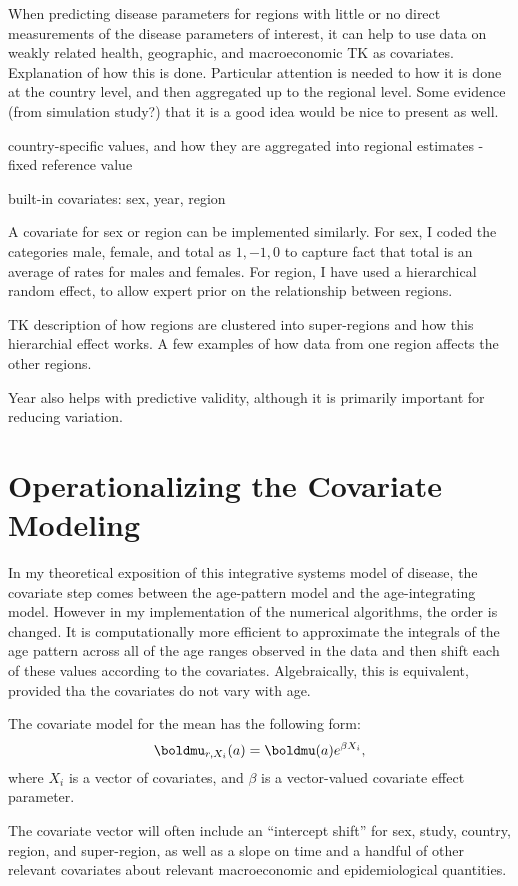 When predicting disease parameters for regions with little or no
direct measurements of the disease parameters of interest, it can help
to use data on weakly related health, geographic, and macroeconomic TK
as covariates. Explanation of how this is done.  Particular attention
is needed to how it is done at the country level, and then aggregated
up to the regional level. Some evidence (from simulation study?) that
it is a good idea would be nice to present as well.

country-specific values, and how they are aggregated into regional
estimates - fixed reference value

built-in covariates: sex, year, region

A covariate for sex or region can be implemented similarly.  For sex,
I coded the categories male, female, and total as $1, -1, 0$ to
capture fact that total is an average of rates for males and females.
For region, I have used a hierarchical random effect, to allow expert
prior on the relationship between regions.

TK description of how regions are clustered into super-regions and how
this hierarchial effect works.  A few examples of how data from one
region affects the other regions.

Year also helps with predictive validity, although it is primarily
important for reducing variation.


\section{Operationalizing the Covariate Modeling}

In my theoretical exposition of this integrative systems model
of disease, the covariate step comes between the age-pattern model and
the age-integrating model.  However in my implementation of the
numerical algorithms, the order is changed.  It is computationally
more efficient to approximate the integrals of the age pattern across
all of the age ranges observed in the data and then shift each of
these values according to the covariates.  Algebraically, this is
equivalent, provided tha the covariates do not vary with age.

The covariate model for the mean has the following form:
\[
\boldmu_{r,X_i}(a) = \boldmu(a) e^{\beta X_i},
\]
where $X_i$ is a vector of covariates, and $\beta$ is a vector-valued
covariate effect parameter.

The covariate vector will often include an ``intercept shift'' for
sex, study, country, region, and super-region, as well as a slope on
time and a handful of other relevant covariates about relevant
macroeconomic and epidemiological quantities.

